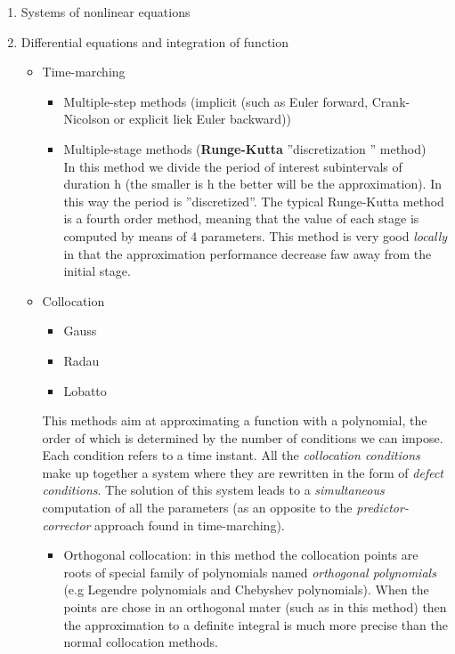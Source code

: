 \begin{enumerate}
\item Systems of nonlinear equations
\item Differential equations and integration of function
\begin{itemize}
\item Time-marching
\begin{itemize}
\item Multiple-step methods (implicit (such as Euler forward, Crank-Nicolson or explicit liek Euler backward))
\item Multiple-stage methods (\textbf{Runge-Kutta} ''discretization '' method)\\
In this method we divide the period of interest subintervals of duration h (the smaller is h the better will be the approximation). In this way the period is ''discretized''. The typical Runge-Kutta method is a fourth order method, meaning that the value of each stage is computed by means of 4 parameters. This method is very good \textit{locally} in that the approximation performance decrease faw away from the initial stage.
\end{itemize}
\item Collocation\\
\begin{itemize}
\item Gauss
\item Radau
\item Lobatto
\end{itemize}
This methods aim at approximating a function with a polynomial, the order of which is determined by the number of conditions we can impose. Each condition refers to a time instant. All the \textit{collocation conditions} make up together a system where they are rewritten in the form of \textit{defect conditions}. The solution of this system leads to a \textit{simultaneous} computation of all the parameters (as an opposite to the \textit{predictor-corrector} approach found in time-marching).
\begin{itemize}
\item Orthogonal collocation: in this method the collocation points are roots of special family of polynomials named \textit{orthogonal polynomials} (e.g Legendre polynomials and Chebyshev polynomials). When the points are chose in an orthogonal mater (such as in this method) then the approximation to a definite integral is much more precise than the normal collocation methods.
\end{itemize}
\end{itemize}

\end{enumerate}
